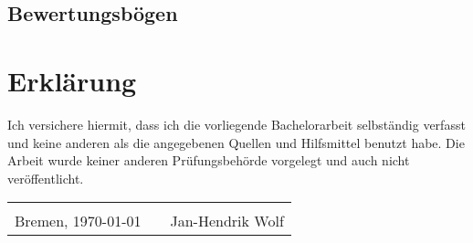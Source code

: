 \documentclass[12pt,numbers=noenddot,parskip,bibliography=totocnumbered,listof=totocnumbered]{scrreprt}
\begin{document}
\begin{appendix}
\section{Bewertungsbögen}
\vspace*{\fill}
\label{lab:Bewertungsbögen}
\vspace*{\fill}
\clearpage
\vspace*{\fill}
\vspace*{\fill}
\clearpage
\vspace*{\fill}
\vspace*{\fill}
\clearpage
\vspace*{\fill}
\vspace*{\fill}
\clearpage
\vspace*{\fill}
\vspace*{\fill}
\clearpage
\vspace*{\fill}
\vspace*{\fill}

\end{appendix}

\clearpage
{}



\listoffigures

\chapter*{Erklärung}
\thispagestyle{empty}
Ich versichere hiermit, dass ich die vorliegende Bachelorarbeit selbständig verfasst und keine anderen als die angegebenen Quellen und Hilfsmittel benutzt habe. Die Arbeit wurde keiner anderen Prüfungsbehörde vorgelegt und auch nicht veröffentlicht.
\begin{center}
\begin{tabular}{lp{2em}l} 
 \hspace{5cm}   && \hspace{4cm} \\\cline{1-1}\cline{3-3} 
 Bremen, \today    && Jan-Hendrik Wolf 
\end{tabular} 
\end{center}
\end{document}
